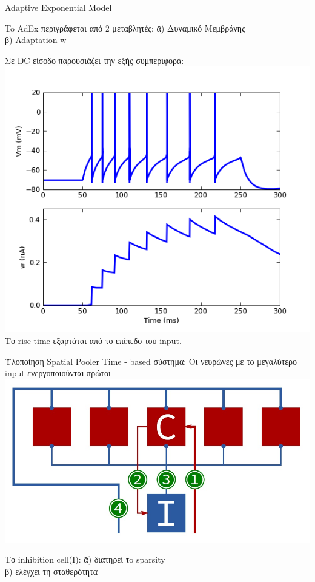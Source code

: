 \documentclass[11pt,center]{beamer}
\begin{document}
	\begin{frame}{Adaptive Exponential Model}
		\begin{tabbing}
  			To AdEx περιγράφεται από 2 μεταβλητές:  \=α) Δυναμικό Μεμβράνης\\
  			\>β) Adaptation w
  		\end{tabbing}
  			\pause
  			Σε DC είσοδο παρουσιάζει την εξής συμπεριφορά:
  			\includegraphics[width=0.4 \textwidth,center]{../pics/adex.jpg}
  			\pause
  			\vfill
  			Tο rise time εξαρτάται από το επίπεδο του input.


	\end{frame}





	\begin{frame}{Υλοποίηση Spatial Pooler}
		Time - based σύστημα: Οι νευρώνες με το μεγαλύτερο input ενεργοποιούνται πρώτοι\\
		\vspace{2em}
		\includegraphics[width=0.5 \textwidth,center]{../pics/spatial_hardware.jpg}
		\pause
		\vfill
		\begin{tabbing}
  			Το inhibition cell(I):  \= α) διατηρεί τo sparsity\\
  			\> β) ελέγχει τη σταθερότητα\\
  		\end{tabbing}
	\end{frame}
\end{document}
